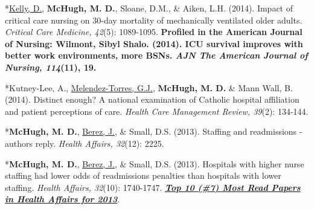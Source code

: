 \documentclass[10pt,]{article}
\begin{document}
{{{{{{{{{{{{{{\begin{hangparas}{.25in}{1}
\end{hangparas}

\vspace{4mm}

\begin{hangparas}{.25in}{1}

*{\underline {Kelly, D.}}, {\textbf {McHugh, M. D.}}, Sloane, D.M., \& Aiken, L.H. (2014). Impact of critical care nursing on 30-day mortality of mechanically ventilated older adults. {\textit {Critical Care Medicine, 42}}(5): 1089-1095. {\textbf {Profiled in the American Journal of Nursing: Wilmont, Sibyl Shalo. (2014). ICU survival improves with better work environments, more BSNs. {\textit {AJN The American Journal of Nursing, 114}}(11), 19.}}

\end{hangparas}

\vspace{4mm}

\begin{hangparas}{.25in}{1}

*Kutney-Lee, A., {\underline {Melendez-Torres, G.J.}}, {\textbf {McHugh, M. D.}} \& Mann Wall, B. (2014). Distinct enough? A national examination of Catholic hospital affiliation and patient perceptions of care. {\textit {Health Care Management Review, 39}}(2): 134-144.

\end{hangparas}

\vspace{4mm}

\begin{hangparas}{.25in}{1}

*{\textbf {McHugh, M. D.}}, {\underline {Berez, J.}}, \& Small, D.S. (2013). Staffing and readmissions - authors reply. {\textit {Health Affairs, 32}}(12): 2225.

\end{hangparas}

\vspace{4mm}

\begin{hangparas}{.25in}{1}

*{\textbf {McHugh, M. D.}}, {\underline {Berez, J.}}, \& Small, D.S. (2013). Hospitals with higher nurse staffing had lower odds of readmissions penalties than hospitals with lower staffing. {\textit {Health Affairs, 32}}(10): 1740-1747. {\textbf {\underline {\textit {Top 10 (\#7) Most Read Papers in Health Affairs for 2013}}}}.

\end{hangparas}

}}}}}}}}}}}}}}
\end{document}
